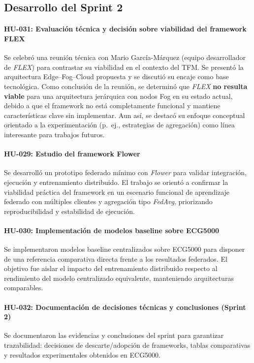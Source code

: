 \documentclass{report}
\begin{document}
\subsection{Desarrollo del Sprint 2}

\paragraph{HU-031: Evaluación técnica y decisión sobre viabilidad del framework FLEX}
Se celebró una reunión técnica con Mario García-Márquez (equipo desarrollador de \emph{FLEX}) para contrastar su viabilidad en el contexto del TFM. Se presentó la arquitectura Edge--Fog--Cloud propuesta y se discutió su encaje como base tecnológica. Como conclusión de la reunión, se determinó que \emph{FLEX} \textbf{no resulta viable} para una arquitectura jerárquica con nodos Fog en su estado actual, debido a que el framework no está completamente funcional y mantiene características clave sin implementar. Aun así, se destacó su enfoque conceptual orientado a la experimentación (p.\ ej., estrategias de agregación) como línea interesante para trabajos futuros.

\paragraph{HU-029: Estudio del framework Flower}
Se desarrolló un prototipo federado mínimo con \textit{Flower} para validar integración, ejecución y entrenamiento distribuido. El trabajo se orientó a confirmar la viabilidad práctica del framework en un escenario funcional de aprendizaje federado con múltiples clientes y agregación tipo \textit{FedAvg}, priorizando reproducibilidad y estabilidad de ejecución.

\paragraph{HU-030: Implementación de modelos baseline sobre ECG5000}
Se implementaron modelos baseline centralizados sobre ECG5000 para disponer de una referencia comparativa directa frente a los resultados federados. El objetivo fue aislar el impacto del entrenamiento distribuido respecto al rendimiento del modelo centralizado equivalente, manteniendo arquitecturas comparables.

\paragraph{HU-032: Documentación de decisiones técnicas y conclusiones (Sprint 2)}
Se documentaron las evidencias y conclusiones del sprint para garantizar trazabilidad: decisiones de descarte/adopción de frameworks, tablas comparativas y resultados experimentales obtenidos en ECG5000.
\end{document}
